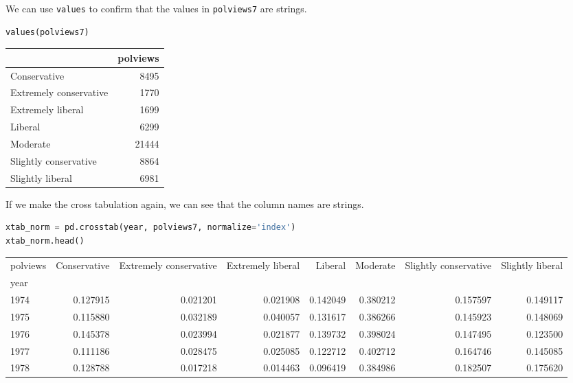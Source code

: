 We can use \passthrough{\lstinline!values!} to confirm that the values
in \passthrough{\lstinline!polviews7!} are strings.

\begin{lstlisting}[language=Python,style=source]
values(polviews7)
\end{lstlisting}

\begin{tabular}{lr}
\toprule
{} &  polviews \\
\midrule
Conservative           &      8495 \\
Extremely conservative &      1770 \\
Extremely liberal      &      1699 \\
Liberal                &      6299 \\
Moderate               &     21444 \\
Slightly conservative  &      8864 \\
Slightly liberal       &      6981 \\
\bottomrule
\end{tabular}

If we make the cross tabulation again, we can see that the column names
are strings.

\begin{lstlisting}[language=Python,style=source]
xtab_norm = pd.crosstab(year, polviews7, normalize='index')
xtab_norm.head()
\end{lstlisting}

\begin{tabular}{lrrrrrrr}
\toprule
polviews &  Conservative &  Extremely conservative &  Extremely liberal &   Liberal &  Moderate &  Slightly conservative &  Slightly liberal \\
year &               &                         &                    &           &           &                        &                   \\
\midrule
1974 &      0.127915 &                0.021201 &           0.021908 &  0.142049 &  0.380212 &               0.157597 &          0.149117 \\
1975 &      0.115880 &                0.032189 &           0.040057 &  0.131617 &  0.386266 &               0.145923 &          0.148069 \\
1976 &      0.145378 &                0.023994 &           0.021877 &  0.139732 &  0.398024 &               0.147495 &          0.123500 \\
1977 &      0.111186 &                0.028475 &           0.025085 &  0.122712 &  0.402712 &               0.164746 &          0.145085 \\
1978 &      0.128788 &                0.017218 &           0.014463 &  0.096419 &  0.384986 &               0.182507 &          0.175620 \\
\bottomrule
\end{tabular}

